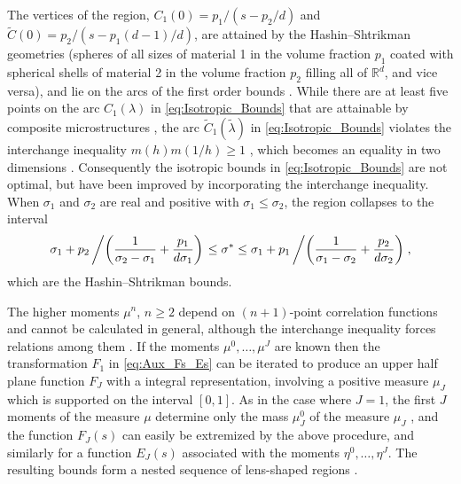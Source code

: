 \documentclass{cmslatex}
\begin{document}
The vertices of the region,
$C_1(0)=p_1/(s-p_2/d)$ and $\tilde{C}(0)=p_2/(s-p_1(d-1)/d)$, are
attained by the Hashin--Shtrikman geometries (spheres of all
sizes of material 1 in the volume fraction $p_1$ coated with spherical
shells of material 2 in the volume fraction $p_2$ filling all of
$\mathbb{R}^d$, and vice versa), and lie on the arcs of the first
order bounds \cite{Golden:1986:BCP}. While there are at least five
points on the arc $C_1(\lambda)$ in \eqref{eq:Isotropic_Bounds} that are
attainable by composite microstructures \cite{Milton:JAP-5286}, the
arc $\tilde{C}_1(\tilde{\lambda})$ in \eqref{eq:Isotropic_Bounds} violates
\cite{Golden:1986:BCP} the interchange inequality $m(h)m(1/h)\geq1$
\cite{Keller:1964:TCC,Schulgasser:1976:CFR}, which becomes an equality
in two dimensions \cite{MILTON:2002:TC}.  Consequently the isotropic
bounds in \eqref{eq:Isotropic_Bounds} are not optimal, but have been
improved \cite{Milton:APL-300,Bergman:AP-78} by incorporating the
interchange inequality. When $\sigma_1$ and $\sigma_2$ are real and positive
with $\sigma_1\leq\sigma_2$, the region collapses to the interval
%
\begin{align*}
  \sigma_1+p_2\left/  \left(\frac{1}{\sigma_2-\sigma_1}+\frac{p_1}{d\sigma_1}\right)\right.
  \leq\sigma^*\leq 
  \sigma_1+p_1\left/  \left(\frac{1}{\sigma_1-\sigma_2}+\frac{p_2}{d\sigma_2}\right)\right.,
\end{align*}
%
which are the Hashin--Shtrikman bounds.


The higher moments $\mu^n$, $n\geq2$ depend on $(n+1)$-point correlation
functions \cite{Golden:CMP-473} and cannot be calculated in general,
although the interchange inequality forces relations among them
\cite{Milton:JAP-5294}. If the moments $\mu^0,\ldots,\mu^J$ are known then the
transformation $F_1$ in \eqref{eq:Aux_Fs_Es} can be iterated to
produce an upper half plane function $F_J$ with a integral
representation, involving a positive measure $\mu_J$ which is supported
on the interval $[0,1]$. As in the case where $J=1$, the first $J$
moments of the measure $\mu$ determine only the mass $\mu_J^0$ of the
measure $\mu_J$ \cite{Golden:1986:BCP}, and the function $F_J(s)$ can
easily be extremized by the above procedure, and similarly for a
function $E_J(s)$ associated with the moments $\eta^0,\ldots,\eta^J$. The
resulting bounds form a nested sequence of lens-shaped regions
\cite{Golden:1986:BCP}.
\end{document}
